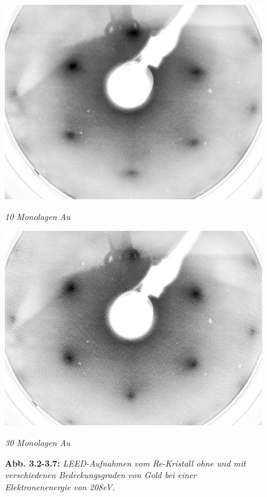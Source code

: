 \begin{figure}[htbp]
	\begin{minipage}[b]{0.5\textwidth} 
		\includegraphics[width=\textwidth]{LEED-Bilder/bearbeitet/10ML_E207}
		\caption{\textit{10 Monolagen Au}}
		\label{10ML} 
	\end{minipage}
	\hfill
	\begin{minipage}[b]{0.5\textwidth}
		\includegraphics[width=\textwidth]{LEED-Bilder/bearbeitet/30ML_E208}
		\caption{\textit{30 Monolagen Au}}
		\label{30ML} 
	\end{minipage}
	\caption*{\textbf{Abb. 3.2-3.7:} \textit{LEED-Aufnahmen vom Re-Kristall ohne und mit
	verschiedenen Bedeckungsgraden von Gold bei einer Elektronenenergie von 208eV.}}
\end{figure}


